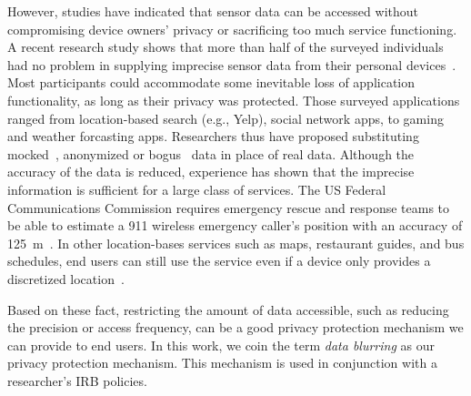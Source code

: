 However, studies have indicated that 
sensor data can be accessed without compromising device 
owners' privacy or sacrificing too much service functioning.
A recent research study shows that more than half of the 
surveyed individuals had no problem in supplying imprecise 
sensor data from their personal devices~\cite{fawaz2014location}. 
Most participants could accommodate some inevitable loss of application 
functionality, as long as their privacy was protected. Those surveyed
applications ranged from location-based search (e.g., Yelp), social 
network apps, to gaming and weather forcasting apps. 
Researchers thus have proposed 
substituting mocked~\cite{beresford2011mockdroid}, anonymized 
or bogus~\cite{zhou2011taming} data in place of real data. Although
the accuracy of the data is reduced, experience has shown 
that the imprecise information is sufficient for a large class of 
services. The US Federal Communications Commission requires 
emergency rescue and 
response teams to be able to estimate a 911 wireless emergency 
caller's position with an accuracy of 125~m~\cite{gruteser2003anonymous, 
reed1998overview}. In other location-bases services such as maps, 
restaurant guides, and bus schedules, end users can still use the 
service even if a device only provides a discretized 
location~\cite{amini2011cache, krumm2007inference}. 

Based on these fact, restricting 
the amount of data accessible, such as reducing the precision or 
access frequency, can be a good privacy protection mechanism we can 
provide to end users. In this work, we coin the term \textit{data blurring}
as our privacy protection mechanism. This mechanism is used in 
conjunction with a researcher's IRB policies. 

